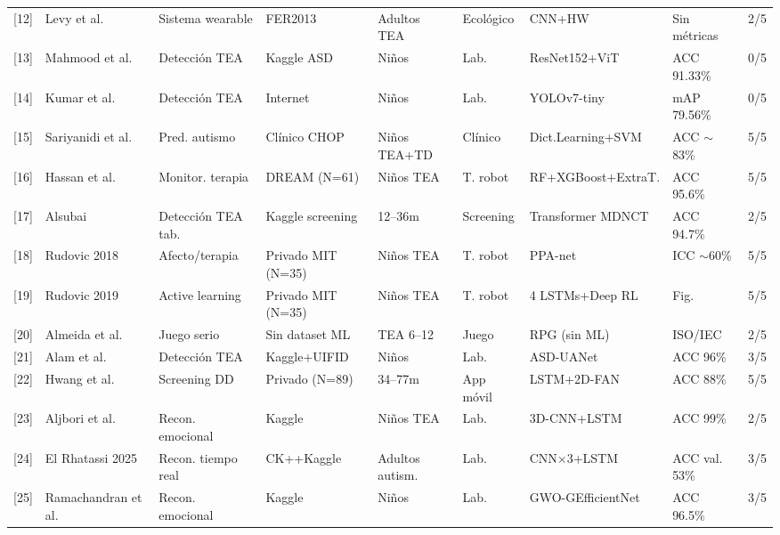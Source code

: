 \documentclass[ASNA,twocolumn]{USG}
\begin{document}
\begin{table}[!t]
{\begin{tabular*}{\textwidth}{@{\extracolsep\fill}clllllllc@{\extracolsep\fill}}
				{[12]} & Levy et al.\        & Sistema wearable    & FER2013            & Adultos TEA     & Ecológico  & CNN+HW                & Sin métricas   & 2/5 \\
				{[13]} & Mahmood et al.\     & Detección TEA       & Kaggle ASD         & Niños           & Lab.       & ResNet152+ViT         & ACC 91.33\%    & 0/5 \\
				{[14]} & Kumar et al.\       & Detección TEA       & Internet           & Niños           & Lab.       & YOLOv7-tiny           & mAP 79.56\%    & 0/5 \\
				{[15]} & Sariyanidi et al.\  & Pred. autismo       & Clínico CHOP       & Niños TEA+TD    & Clínico    & Dict.Learning+SVM     & ACC $\sim$83\% & 5/5 \\
				{[16]} & Hassan et al.\      & Monitor. terapia    & DREAM (N=61)       & Niños TEA       & T. robot   & RF+XGBoost+ExtraT.    & ACC 95.6\%     & 5/5 \\
				{[17]} & Alsubai             & Detección TEA tab.  & Kaggle screening   & 12--36m         & Screening  & Transformer MDNCT     & ACC 94.7\%     & 2/5 \\
				{[18]} & Rudovic 2018        & Afecto/terapia      & Privado MIT (N=35) & Niños TEA       & T. robot   & PPA-net               & ICC $\sim$60\% & 5/5 \\
				{[19]} & Rudovic 2019        & Active learning     & Privado MIT (N=35) & Niños TEA       & T. robot   & 4 LSTMs+Deep RL       & Fig.           & 5/5 \\
				{[20]} & Almeida et al.\     & Juego serio         & Sin dataset ML     & TEA 6--12       & Juego      & RPG (sin ML)          & ISO/IEC        & 2/5 \\
				{[21]} & Alam et al.\        & Detección TEA       & Kaggle+UIFID       & Niños           & Lab.       & ASD-UANet             & ACC 96\%       & 3/5 \\
				{[22]} & Hwang et al.\       & Screening DD        & Privado (N=89)     & 34--77m         & App móvil  & LSTM+2D-FAN           & ACC 88\%       & 5/5 \\
				{[23]} & Aljbori et al.\     & Recon. emocional    & Kaggle             & Niños TEA       & Lab.       & 3D-CNN+LSTM           & ACC 99\%       & 2/5 \\
				{[24]} & El Rhatassi 2025    & Recon. tiempo real  & CK++Kaggle         & Adultos autism. & Lab.       & CNN$\times$3+LSTM     & ACC val. 53\%  & 3/5 \\
				{[25]} & Ramachandran et al.\ & Recon. emocional   & Kaggle             & Niños           & Lab.       & GWO-GEfficientNet     & ACC 96.5\%     & 3/5 \\

\end{tabular*}}
\end{table}
\end{document}
